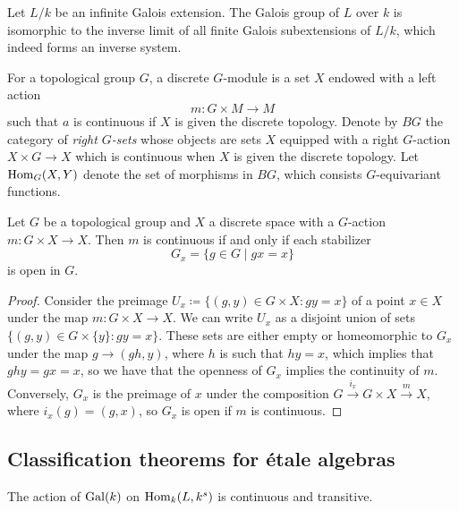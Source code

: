 \begin{remark}
	Let $L/k$ be an infinite Galois extension. The Galois group of $L$ over $k$ is isomorphic to the inverse limit of all finite Galois subextensions of $L/k$, which indeed forms an inverse system.
\end{remark}

\begin{definition}
	For a topological group $G$, a discrete $G$-module is a set $X$ endowed with a left action
	\[
		m \colon G \times M \to M
	\]
	such that $a$ is continuous if $X$ is given the discrete topology. Denote by $BG$ the category of \textit{right $G$-sets} whose objects are sets $X$ equipped with a right $G$-action $X \times G \to X$ which is continuous when $X$ is given the discrete topology. Let $\operatorname{Hom}_G(X,Y)$ denote the set of morphisms in $BG$, which consists $G$-equivariant functions.
\end{definition}


\begin{lemma}\label{lemma:stabilizer}
	Let $G$ be a topological group and $X$ a discrete space with a $G$-action $m \colon G \times X \to X$. Then $m$ is continuous if and only if each stabilizer
	\[
		G_x = \{ g \in G \mid gx = x \}
	\]
	is open in $G$.
\end{lemma}

\begin{proof}
	Consider the preimage $U_x \coloneqq \{ (g,y) \in G \times X \colon gy = x\}$ of a point $x \in X$ under the map $m \colon G \times X \to X$. We can write $U_x$ as a disjoint union of sets $\{(g,y) \in G \times \{y\} \colon gy = x\}$. These sets are either empty or homeomorphic to $G_x$ under the map $g \to (gh, y)$, where $h$ is such that $hy = x$, which implies that $ghy = gx = x$, so we have that the openness of $G_x$ implies the continuity of $m$. Conversely, $G_x$ is the preimage of $x$ under the composition $G \xrightarrow{i_x} G \times X \xrightarrow{m} X$, where $i_x(g) = (g,x)$, so $G_x$ is open if $m$ is continuous.
\end{proof}

\subsection{Classification theorems for \'etale algebras}

\begin{theorem}
	The action of $\operatorname{Gal}(k)$ on $\operatorname{Hom}_k(L, k^s)$ is continuous and transitive.
\end{theorem}

